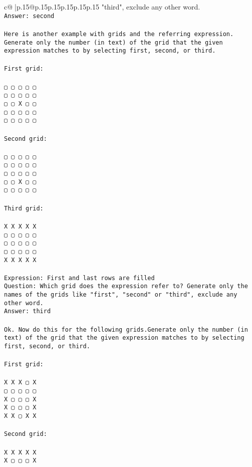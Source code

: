 \documentclass{article}
\begin{document}
{\begin{supertabular}{c@{$\;$}|p{.15\linewidth}@{}p{.15\linewidth}p{.15\linewidth}p{.15\linewidth}p{.15\linewidth}p{.15\linewidth}}
{{{"third", exclude any other word.\\ \tt Answer: second\\ \tt \\ \tt Here is another example with grids and the referring expression. Generate only the number (in text) of the grid that the given expression matches to by selecting first, second, or third.\\ \tt \\ \tt First grid:\\ \tt \\ \tt ▢ ▢ ▢ ▢ ▢\\ \tt ▢ ▢ ▢ ▢ ▢\\ \tt ▢ ▢ X ▢ ▢\\ \tt ▢ ▢ ▢ ▢ ▢\\ \tt ▢ ▢ ▢ ▢ ▢\\ \tt \\ \tt Second grid:\\ \tt \\ \tt ▢ ▢ ▢ ▢ ▢\\ \tt ▢ ▢ ▢ ▢ ▢\\ \tt ▢ ▢ ▢ ▢ ▢\\ \tt ▢ ▢ X ▢ ▢\\ \tt ▢ ▢ ▢ ▢ ▢\\ \tt \\ \tt Third grid:\\ \tt \\ \tt X X X X X\\ \tt ▢ ▢ ▢ ▢ ▢\\ \tt ▢ ▢ ▢ ▢ ▢\\ \tt ▢ ▢ ▢ ▢ ▢\\ \tt X X X X X\\ \tt \\ \tt Expression: First and last rows are filled\\ \tt Question: Which grid does the expression refer to? Generate only the names of the grids like "first", "second" or "third", exclude any other word.\\ \tt Answer: third\\ \tt \\ \tt Ok. Now do this for the following grids.Generate only the number (in text) of the grid that the given expression matches to by selecting first, second, or third.\\ \tt \\ \tt First grid:\\ \tt \\ \tt X X X ▢ X\\ \tt ▢ ▢ ▢ ▢ ▢\\ \tt X ▢ ▢ ▢ X\\ \tt X ▢ ▢ ▢ X\\ \tt X X ▢ X X\\ \tt \\ \tt Second grid:\\ \tt \\ \tt X X X X X\\ \tt X ▢ ▢ ▢ X\\ }}}
\end{supertabular}}
\end{document}
